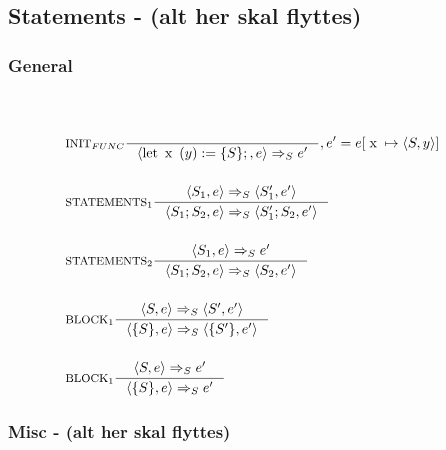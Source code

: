 

\subsection{Statements - (alt her skal flyttes)}

\subsubsection{General}
\begin{align*}
\\\\
&\inference[$\text{INIT}_{FUNC}$]{}
                         {\Braket{\Tlet \Tx(y) := \{S\};,e} \Rightarrow_S e'}
												 {, e' = e[\Tx \mapsto \Braket{S,y}]}
\\\\
&\inference[$\text{STATEMENTS}_1$]{\Braket{S_1,e} \Rightarrow_S \Braket{S_1',e'}}
                         {\Braket{S_1;S_2,e} \Rightarrow_S \Braket{S_1';S_2,e'}}
\\\\
&\inference[$\text{STATEMENTS}_2$]{\Braket{S_1,e} \Rightarrow_S e'}
                         {\Braket{S_1;S_2,e} \Rightarrow_S \Braket{S_2,e'}}
\\\\
&\inference[$\text{BLOCK}_1$]{\Braket{S,e} \Rightarrow_S \Braket{S',e'}}
                         {\Braket{\{S\},e} \Rightarrow_S \Braket{\{S'\},e'}}
\\\\
&\inference[$\text{BLOCK}_1$]{\Braket{S,e} \Rightarrow_S e'}
                         {\Braket{\{S\},e} \Rightarrow_S e'}
\end{align*}


\subsubsection{Misc - (alt her skal flyttes)}
 
